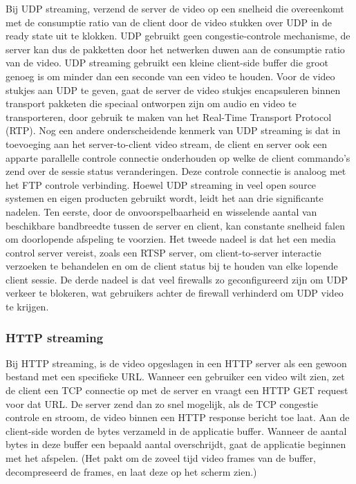 Bij UDP streaming, verzend de server de video op een snelheid die overeenkomt met de consumptie ratio van de client door de video stukken over UDP in de ready state uit te klokken. UDP gebruikt geen congestie-controle mechanisme, de server kan dus de pakketten door het netwerken duwen aan de consumptie ratio van de video. UDP streaming gebruikt een kleine client-side buffer die groot genoeg is om minder dan een seconde van een video te houden. Voor de video stukjes aan UDP te geven, gaat de server de video stukjes encapsuleren binnen transport pakketen die speciaal ontworpen zijn om audio en video te transporteren, door gebruik te maken van het Real-Time Transport Protocol (RTP). Nog een andere onderscheidende kenmerk van UDP streaming is dat in toevoeging aan het server-to-client video stream, de client en server ook een apparte parallelle controle connectie onderhouden op welke de client commando’s zend over de sessie status veranderingen. Deze controle connectie is analoog met het FTP controle verbinding.
Hoewel UDP streaming in veel open source systemen en eigen producten gebruikt wordt, leidt het aan drie significante nadelen. Ten eerste, door de onvoorspelbaarheid en wisselende aantal van beschikbare bandbreedte tussen de server en client, kan constante snelheid falen om doorlopende afspeling te voorzien. Het tweede nadeel is dat het een media control server vereist, zoals een RTSP server, om client-to-server interactie verzoeken te behandelen en om de client status bij te houden van elke lopende client sessie. De derde nadeel is dat veel firewalls zo geconfigureerd zijn om UDP verkeer te blokeren, wat gebruikers achter de firewall verhinderd om UDP video te krijgen.

\subsubsection{HTTP streaming}

Bij HTTP streaming, is de video opgeslagen in een HTTP server als een gewoon bestand met een specifieke URL. Wanneer een gebruiker een video wilt zien, zet de client een TCP connectie op met de server en vraagt een HTTP GET request voor dat URL. De server zend dan zo snel mogelijk, als de TCP congestie controle en stroom, de video binnen een HTTP response bericht toe laat. Aan de client-side worden de bytes verzameld in de applicatie buffer. Wanneer de aantal bytes in deze buffer een bepaald aantal overschrijdt, gaat de applicatie beginnen met het afspelen. (Het pakt om de zoveel tijd video frames van de buffer, decompreseerd de frames, en laat deze op het scherm zien.)


